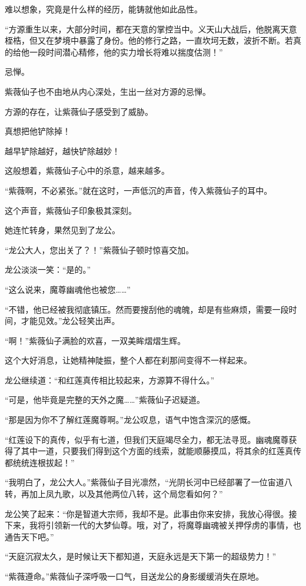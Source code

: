 \begin{this_body}
难以想象，究竟是什么样的经历，能铸就他如此品性。

“方源重生以来，大部分时间，都在天意的掌控当中。义天山大战后，他脱离天意桎梏，但又在梦境中暴露了身份。他的修行之路，一直坎坷无数，波折不断。若真的给他一段时间潜心精修，他的实力增长将难以揣度估测！”

忌惮。

紫薇仙子也不由地从内心深处，生出一丝对方源的忌惮。

方源的存在，让紫薇仙子感受到了威胁。

真想把他铲除掉！

越早铲除越好，越快铲除越妙！

这般想着，紫薇仙子心中的杀意，越来越多。

“紫薇啊，不必紧张。”就在这时，一声低沉的声音，传入紫薇仙子的耳中。

这个声音，紫薇仙子印象极其深刻。

她连忙转身，果然见到了龙公。

“龙公大人，您出关了？！”紫薇仙子顿时惊喜交加。

龙公淡淡一笑：“是的。”

“这么说来，魔尊幽魂他也被您……”

“不错，他已经被我彻底镇压。然而要搜刮他的魂魄，却是有些麻烦，需要一段时间，才能见效。”龙公轻笑出声。

“啊！”紫薇仙子满脸的欢喜，一双美眸熠熠生辉。

这个大好消息，让她精神陡振，整个人都在刹那间变得不一样起来。

龙公继续道：“和红莲真传相比较起来，方源算不得什么。”

“可是，他毕竟是完整的天外之魔……”紫薇仙子迟疑道。

“那是因为你不了解红莲魔尊啊。”龙公叹息，语气中饱含深沉的感慨。

“红莲设下的真传，似乎有七道，但我们天庭竭尽全力，都无法寻觅。幽魂魔尊获得了其中一道，只要我们得到这个方面的线索，就能顺藤摸瓜，将其余的红莲真传都统统连根拔起！”

“我明白了，龙公大人。”紫薇仙子目光凛然，“光阴长河中已经部署了一位宙道八转，再加上凤九歌，以及其他两位八转，这个局您看如何？”

龙公笑了起来：“你是智道大宗师，我却不是。此事由你来安排，我放心得很。接下来，我将引领新一代的大梦仙尊。哦，对了，将魔尊幽魂被关押俘虏的事情，也通告天下吧。”

“天庭沉寂太久，是时候让天下都知道，天庭永远是天下第一的超级势力！”

“紫薇遵命。”紫薇仙子深呼吸一口气，目送龙公的身影缓缓消失在原地。


\end{this_body}
